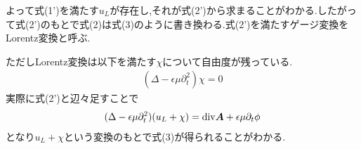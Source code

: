 \documentclass[uplatex,a4j,11pt]{jsarticle}
\begin{document}
よって式(1')を満たす$u_L$が存在し,それが式(2')から求まることがわかる.したがって式(2')のもとで式(2)は式(3)のように書き換わる.式(2')を満たすゲージ変換をLorentz変換と呼ぶ.\par
ただしLorentz変換は以下を満たす$\chi$について自由度が残っている.
\begin{align}
  (\Delta-\epsilon\mu\partial_t^2)\chi=0\tag{3'}
\end{align}
実際に式(2')と辺々足すことで
\begin{align*}
  (\Delta-\epsilon\mu\partial_t^2)(u_L+\chi)={\rm div}{\bm A}+\epsilon\mu\partial_t\phi
\end{align*}
となり$u_L+\chi$という変換のもとで式(3)が得られることがわかる.
\end{document}
